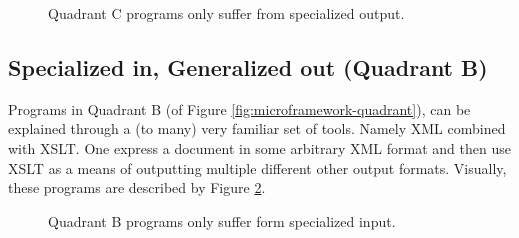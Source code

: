 \documentclass{scrreprt}
\begin{document}
\begin{figure}[h]
  \centering


  \caption{Quadrant C programs only suffer from specialized output.}
  \label{fig:workflows-framework-gen-in-spec-out}
\end{figure}



\subsection{Specialized in, Generalized out (Quadrant B)}
Programs in Quadrant B (of Figure \ref{fig:microframework-quadrant}), can be explained through a (to many) very familiar set of tools. Namely XML combined with XSLT. One express a document in some arbitrary XML format and then use XSLT as a means of outputting multiple different other output formats. Visually, these programs are described by Figure \ref{fig:workflows-framework-spec-in-gen-out}.


\begin{figure}[h]
  \centering


  \caption{Quadrant B programs only suffer form specialized input.}
  \label{fig:workflows-framework-spec-in-gen-out}
\end{figure}
\end{document}
